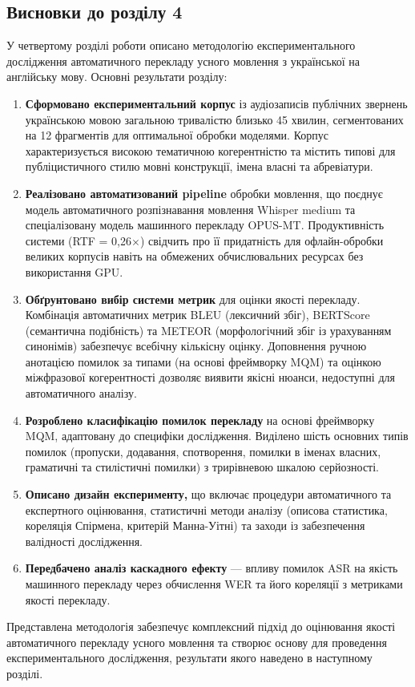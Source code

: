 \subsection*{Висновки до розділу 4}

У четвертому розділі роботи описано методологію експериментального дослідження
автоматичного перекладу усного мовлення з української на англійську мову.
Основні результати розділу:

\begin{enumerate}

\item \textbf{Сформовано експериментальний корпус} із аудіозаписів
публічних звернень українською мовою загальною тривалістю близько 45 хвилин,
сегментованих на 12 фрагментів для оптимальної обробки моделями.
Корпус характеризується високою тематичною когерентністю та містить
типові для публіцистичного стилю мовні конструкції, імена власні та
абревіатури.

\item \textbf{Реалізовано автоматизований pipeline} обробки мовлення,
що поєднує модель автоматичного розпізнавання мовлення Whisper medium
та спеціалізовану модель машинного перекладу OPUS-MT.
Продуктивність системи (RTF = 0,26$\times$) свідчить
про її придатність для офлайн-обробки великих корпусів навіть на
обмежених обчислювальних ресурсах без використання GPU.

\item \textbf{Обґрунтовано вибір системи метрик} для оцінки якості
перекладу. Комбінація автоматичних метрик BLEU (лексичний збіг),
BERTScore (семантична подібність) та METEOR (морфологічний збіг із
урахуванням синонімів) забезпечує всебічну кількісну оцінку.
Доповнення ручною анотацією помилок за типами (на основі фреймворку
MQM) та оцінкою міжфразової когерентності дозволяє виявити якісні
нюанси, недоступні для автоматичного аналізу.

\item \textbf{Розроблено класифікацію помилок перекладу} на основі
фреймворку MQM, адаптовану до специфіки дослідження. Виділено шість
основних типів помилок (пропуски, додавання, спотворення, помилки
в іменах власних, граматичні та стилістичні помилки) з трирівневою
шкалою серйозності.

\item \textbf{Описано дизайн експерименту,} що включає процедури
автоматичного та експертного оцінювання, статистичні методи аналізу
(описова статистика, кореляція Спірмена, критерій Манна-Уітні) та
заходи із забезпечення валідності дослідження.

\item \textbf{Передбачено аналіз каскадного ефекту} — впливу помилок
ASR на якість машинного перекладу через обчислення WER та його
кореляції з метриками якості перекладу.

\end{enumerate}

Представлена методологія забезпечує комплексний підхід до оцінювання
якості автоматичного перекладу усного мовлення та створює основу для
проведення експериментального дослідження, результати якого наведено
в наступному розділі.
